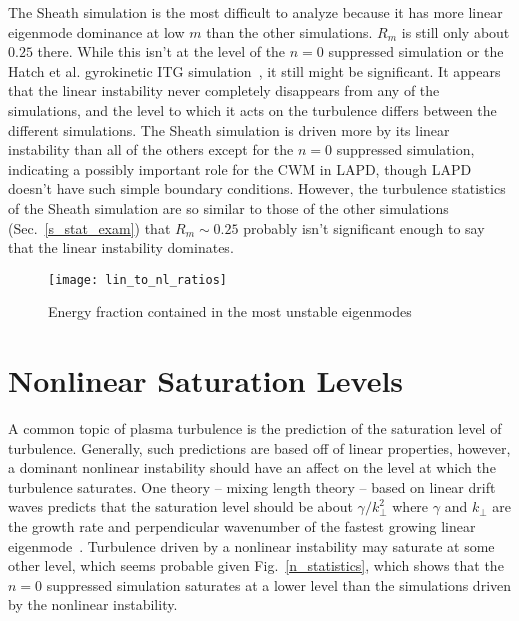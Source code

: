 The Sheath simulation is the most difficult to analyze because it has more linear eigenmode dominance at low $m$ than the other simulations. $R_m$ is still only about $0.25$ there. While this isn't
at the level of the $n=0$ suppressed simulation or the Hatch et al. gyrokinetic ITG simulation~\cite{hatch2011}, it still might be significant. It appears that the linear instability
never completely disappears from any of the simulations, and the level to which it acts on the turbulence differs between the different simulations. The Sheath simulation is driven more by
its linear instability than all of the others except for the $n=0$ suppressed simulation, indicating a possibly important role for the CWM in LAPD, though LAPD doesn't have such simple
boundary conditions. However, the turbulence statistics of the Sheath simulation are so similar to those of the other simulations (Sec.~\ref{s_stat_exam}) that $R_m \sim 0.25$ probably
isn't significant enough to say that the linear instability dominates.


\begin{figure}[!ht]
\centerline{\texttt{[image: lin\_to\_nl\_ratios]}}
\caption{Energy fraction contained in the most unstable eigenmodes}
\label{lin_to_nl_ratios}
\end{figure}



\section{Nonlinear Saturation Levels}
\label{ss_nl_sat_levels}

A common topic of plasma turbulence is the prediction of the saturation level of turbulence. Generally, such predictions are based off of linear properties, however, a dominant nonlinear
instability should have an affect on the level at which the turbulence saturates. One theory -- mixing length theory -- based on linear drift waves predicts that the saturation level should
be about $\gamma/k_\perp^2$ where $\gamma$ and $k_\perp$ are the growth rate and perpendicular wavenumber of the fastest growing linear eigenmode~\cite{horton1990}. Turbulence driven
by a nonlinear instability may saturate at some other level, which seems probable given Fig.~\ref{n_statistics}, which shows that the $n=0$ suppressed simulation saturates
at a lower level than the simulations driven by the nonlinear instability.

